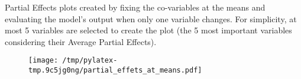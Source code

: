 \documentclass{article}%
\begin{document}
                Partial Effects plots created by fixing the co-variables at
                the means and evaluating the model's output when only one
                variable changes. For simplicity, at most 5 variables are
                selected to create the plot (the 5 most important variables
                considering their Average Partial Effects).

                \vfill%


\begin{figure}[H]%
\centering%
\texttt{[image: /tmp/pylatex-tmp.9c5jg0ng/partial\_effets\_at\_means.pdf]}%
\end{figure}

%
\vfill \pagebreak

%
\end{document}
